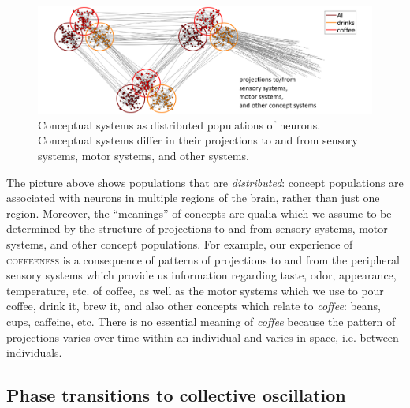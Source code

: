   
\begin{figure}
\includegraphics[width=\textwidth]{figures/Tilsen-img9.png}
\caption{Conceptual systems as distributed populations of neurons. Conceptual systems differ in their projections to and from sensory systems, motor systems, and other systems.}
\label{fig:2:2}
\end{figure}
 

  The picture above shows populations that are \textit{distributed}: concept populations are associated with neurons in multiple regions of the brain, rather than just one region. Moreover, the “meanings” of concepts are qualia which we assume to be determined by the structure of projections to and from sensory systems, motor systems, and other concept populations. For example, our experience of \textsc{coffeeness} is a consequence of patterns of projections to and from the peripheral sensory systems which provide us information regarding taste, odor, appearance, temperature, etc. of coffee, as well as the motor systems which we use to pour coffee, drink it, brew it, and also other concepts which relate to \textit{coffee}: beans, cups, caffeine, etc. There is no essential meaning of \textit{coffee} because the pattern of projections varies over time within an individual and varies in space, i.e. between individuals.
\subsection{{\textbf{Phase transitions to collective oscillation}}}


